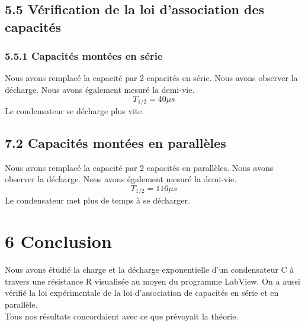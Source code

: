 \documentclass{report}
\begin{document}
\subsection*{5.5 V\'erification de la loi d'association des capacit\'es}
\subsubsection*{5.5.1 Capacit\'es mont\'ees en s\'erie}
\hspace*{0.5cm}
Nous avons remplac\'e la capacit\'e par 2 capacit\'es en s\'erie. Nous avons observer la d\'echarge. Nous avons \'egalement mesur\'e la demi-vie.
\begin{equation}
   T_{1/2} = 40\mu s
\end{equation}
Le condensateur se décharge plus vite.
\subsection*{7.2 Capacit\'es mont\'ees en parall\`eles}
\hspace*{0.5cm}
Nous avons remplac\'e la capacit\'e par 2 capacit\'es en parall\`eles. Nous avons observer la d\'echarge. Nous avons \'egalement mesur\'e la demi-vie.
\begin{equation}
   T_{1/2} = 116\mu s
\end{equation}
Le condensateur met plus de temps à se décharger.
\section*{6 Conclusion}
\hspace*{0.5cm}
Nous avons \'etudi\'e la charge et la d\'echarge exponentielle d'un condensateur C \`a travers une r\'esistance R visualis\'ee au moyen du programme LabView. On a aussi v\'erifi\'e la loi exp\'erimentale de la loi d'association de capacit\'es en s\'erie et en parall\`ele.\\

Tous nos r\'esultats concordaient avec ce que pr\'evoyait la th\'eorie.
\end{document}
